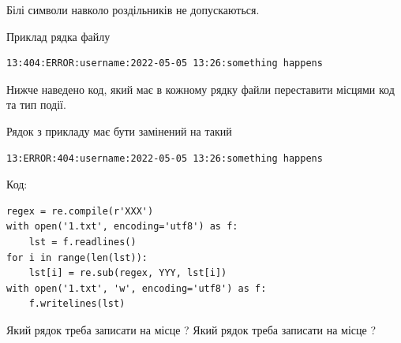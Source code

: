 \documentclass[12pt, ukrainian]{article}
\begin{document}
{Білі символи навколо роздільників не допускаються.

Приклад рядка файлу



\begin{verbatim}
13:404:ERROR:username:2022-05-05 13:26:something happens
\end{verbatim}


Нижче наведено код, який має в кожному рядку файли переставити місцями код та тип події.

Рядок з прикладу має бути замінений на такий



\begin{verbatim}
13:ERROR:404:username:2022-05-05 13:26:something happens
\end{verbatim}




Код:



\begin{verbatim}
regex = re.compile(r'XXX')
with open('1.txt', encoding='utf8') as f:
    lst = f.readlines()
for i in range(len(lst)):
    lst[i] = re.sub(regex, YYY, lst[i])
with open('1.txt', 'w', encoding='utf8') as f:
    f.writelines(lst)
\end{verbatim}





Який рядок треба записати на місце  ?
Який рядок треба записати на місце  ?\par

}
\newpage
\end{document}
